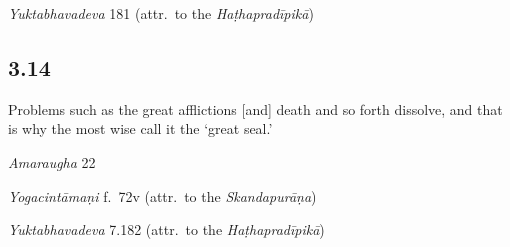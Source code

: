 \begin{ekdosis}
\begin{testimonia}[hp03_013]
\emph{Yuktabhavadeva} 181 (attr.~to the \emph{Haṭhapradīpikā})
\begin{versinnote}
\end{versinnote}
\end{testimonia}


\subsection*{3.14}
\begin{translation}[hp03_014]
Problems such as the great afflictions [and] death and so forth dissolve, and that is why the most wise call it the `great seal.'
\end{translation}

\begin{sources}[hp03_014]
\emph{Amaraugha} 22
\begin{versinnote}
\tl{\var{mahākleśādayo doṣā ] mahārogā mahākleśā \vl}\\+}
\tl{\var{bhidyante ] jīryante \vl}\\!}
\end{versinnote}
\end{sources}

\begin{testimonia}[hp03_014]
\emph{Yogacintāmaṇi} f.~72v (attr.~to the \emph{Skandapurāṇa})
\begin{versinnote}
\end{versinnote}

\emph{Yuktabhavadeva} 7.182 (attr.~to the \emph{Haṭhapradīpikā})
\begin{versinnote}
\end{versinnote}
\end{testimonia}


\end{ekdosis}
